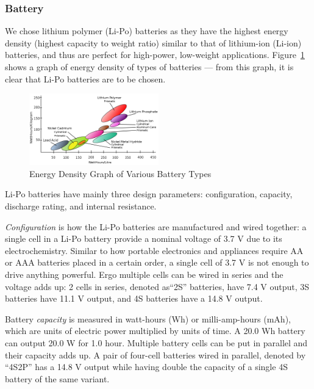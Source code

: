 \subsubsection{Battery}

We chose lithium polymer (Li-Po) batteries as they have the highest energy density (highest capacity to weight ratio) similar to that of lithium-ion (Li-ion) batteries, and thus are perfect for high-power, low-weight applications. Figure~\ref{fig:batterytypes} shows a graph of energy density of types of batteries \cite{battery} --- from this graph, it is clear that Li-Po batteries are to be chosen.

\begin{figure}[h]
    \centering
    \includegraphics[width=0.5\textwidth]{img/energydensity.png}
    \caption{Energy Density Graph of Various Battery Types}
    \label{fig:batterytypes}
\end{figure}

Li-Po batteries have mainly three design parameters: configuration, capacity,  discharge rating, and internal resistance.

\textit{Configuration} is how the Li-Po batteries are manufactured and wired together: a single cell in a Li-Po battery provide a 
nominal voltage of 3.7 V due to its electrochemistry.
Similar to how portable electronics and appliances require AA or AAA batteries placed in a certain order, a single cell of 3.7 V is not enough to drive anything powerful. Ergo multiple cells can be wired in series and the 
voltage adds up: 2 cells in series, denoted as``2S'' batteries, have 7.4 V output, 3S batteries have 11.1 V output, and 4S batteries have a 14.8 V output. 

Battery \textit{capacity} is measured in watt-hours (Wh) or milli-amp-hours (mAh), which are units of electric power multiplied by units of time. A 20.0 Wh battery can output 20.0 W for 1.0 hour. Multiple battery cells can be put in parallel and their capacity adds up. A pair of four-cell batteries wired in parallel, denoted by ``4S2P'' has a 14.8 V output while having double the capacity of a single 4S battery of the same variant.

